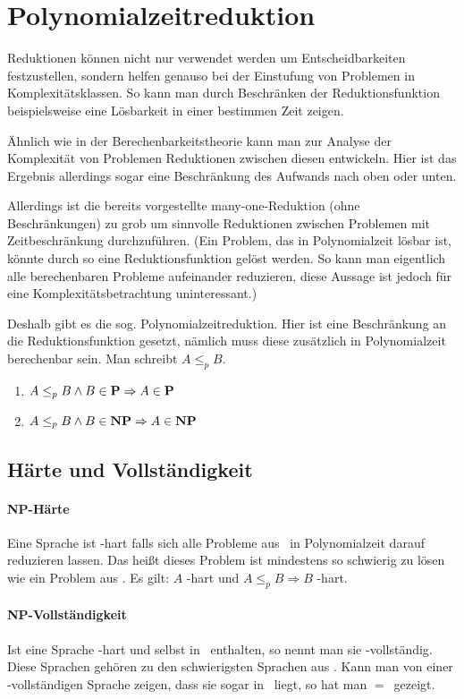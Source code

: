 \section{Polynomialzeitreduktion}\label{sec:polyred}
Reduktionen können nicht nur verwendet werden um Entscheidbarkeiten festzustellen, sondern helfen genauso bei der Einstufung von Problemen in Komplexitätsklassen. So kann man durch Beschränken der Reduktionsfunktion beispielsweise eine Lösbarkeit in einer bestimmen Zeit zeigen.

Ähnlich wie in der Berechenbarkeitstheorie kann man zur Analyse der Komplexität von Problemen Reduktionen zwischen diesen entwickeln. Hier ist das Ergebnis allerdings sogar eine Beschränkung des Aufwands nach oben oder unten.

Allerdings ist die bereits vorgestellte many-one-Reduktion (ohne Beschränkungen) zu grob um sinnvolle Reduktionen zwischen Problemen mit Zeitbeschränkung durchzuführen. {\scriptsize(Ein Problem, das in Polynomialzeit lösbar ist, könnte durch so eine Reduktionsfunktion gelöst werden. So kann man eigentlich alle berechenbaren Probleme aufeinander reduzieren, diese Aussage ist jedoch für eine Komplexitätsbetrachtung uninteressant.)}

Deshalb gibt es die sog. Polynomialzeitreduktion. Hier ist eine Beschränkung an die Reduktionsfunktion gesetzt, nämlich muss diese zusätzlich in Polynomialzeit berechenbar sein. Man schreibt $A\leq_p B$.
\begin{enumerate}
	\item $A\leq_p B\wedge B\in \text{\textbf{P}}\Rightarrow A\in\text{\textbf{P}}$
	\item $A\leq_p B\wedge B\in \text{\textbf{NP}}\Rightarrow A\in\text{\textbf{NP}}$
\end{enumerate}


\subsection{Härte und Vollständigkeit}
\paragraph{NP-Härte}
Eine Sprache ist \npoly-hart falls sich alle Probleme aus \npoly\ in Polynomialzeit darauf reduzieren lassen. Das heißt dieses Problem ist mindestens so schwierig zu lösen wie ein Problem aus \npoly. Es gilt: $A$ \npoly-hart und $A\leq_p B\Rightarrow B$ \npoly-hart.
\paragraph{NP-Vollständigkeit}
Ist eine Sprache \npoly-hart und selbst in \npoly\ enthalten, so nennt man sie \npoly-vollständig. Diese Sprachen gehören zu den schwierigsten Sprachen aus \npoly. Kann man von einer \npoly-vollständigen Sprache zeigen, dass sie sogar in \poly\ liegt, so hat man \poly$=$\npoly\ gezeigt.

